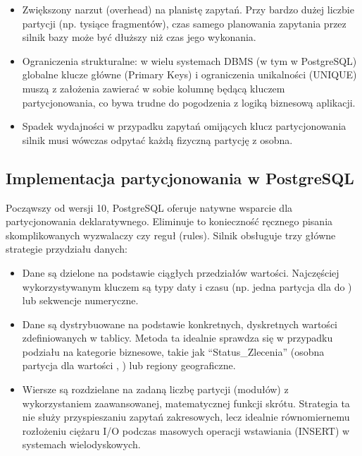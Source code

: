 \documentclass[a4paper,11pt,english,openany,oneside]{sphinxmanual}
\begin{document}
\sphinxAtStartPar
{}
\begin{itemize}
\item {} 
\sphinxAtStartPar
Zwiększony narzut (overhead) na planistę zapytań. Przy bardzo dużej liczbie partycji (np. tysiące fragmentów), czas samego planowania zapytania przez silnik bazy może być dłuższy niż czas jego wykonania.

\item {} 
\sphinxAtStartPar
Ograniczenia strukturalne: w wielu systemach DBMS (w tym w PostgreSQL) globalne klucze główne (Primary Keys) i ograniczenia unikalności (UNIQUE) muszą z założenia zawierać w sobie kolumnę będącą kluczem partycjonowania, co bywa trudne do pogodzenia z logiką biznesową aplikacji.

\item {} 
\sphinxAtStartPar
Spadek wydajności w przypadku zapytań omijących klucz partycjonowania \textendash{} silnik musi wówczas odpytać każdą fizyczną partycję z osobna.

\end{itemize}


\subsection{Implementacja partycjonowania w PostgreSQL}
\label{\detokenize{rozdzial_2/rozdzial_26/index:implementacja-partycjonowania-w-postgresql}}
\sphinxAtStartPar
Począwszy od wersji 10, PostgreSQL oferuje natywne wsparcie dla partycjonowania deklaratywnego. Eliminuje to konieczność ręcznego pisania skomplikowanych wyzwalaczy czy reguł (rules). Silnik obsługuje trzy główne strategie przydziału danych:
\begin{itemize}
\item {} 
\sphinxAtStartPar
{} Dane są dzielone na podstawie ciągłych przedziałów wartości. Najczęściej wykorzystywanym kluczem są typy daty i czasu (np. jedna partycja dla  do ) lub sekwencje numeryczne.

\item {} 
\sphinxAtStartPar
{} Dane są dystrybuowane na podstawie konkretnych, dyskretnych wartości zdefiniowanych w tablicy. Metoda ta idealnie sprawdza się w przypadku podziału na kategorie biznesowe, takie jak “Status\_Zlecenia” (osobna partycja dla wartości , ) lub regiony geograficzne.

\item {} 
\sphinxAtStartPar
{} Wiersze są rozdzielane na zadaną liczbę partycji (modułów) z wykorzystaniem zaawansowanej, matematycznej funkcji skrótu. Strategia ta nie służy przyspieszaniu zapytań zakresowych, lecz idealnie równomiernemu rozłożeniu ciężaru I/O podczas masowych operacji wstawiania (INSERT) w systemach wielodyskowych.

\end{itemize}
\end{document}
